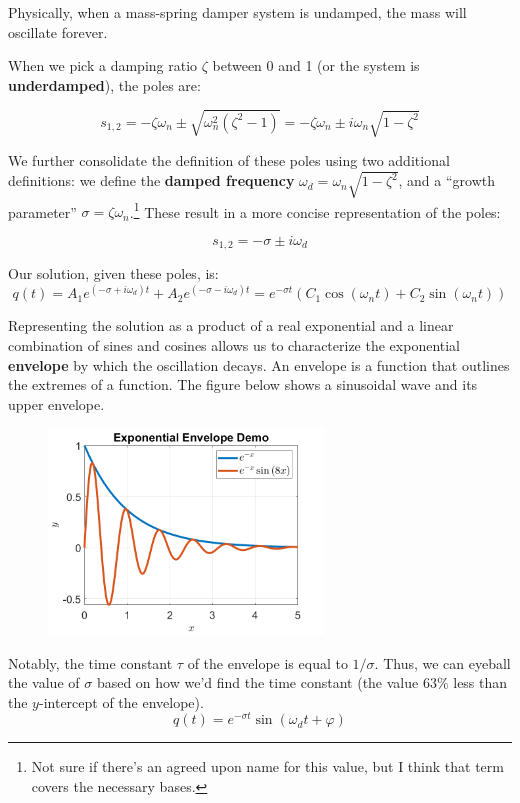 \documentclass[
  letterpaper,
  DIV=11,
  numbers=noendperiod]{scrreprt}
\begin{document}
Physically, when a mass-spring damper system is undamped, the mass will
oscillate forever.

When we pick a damping ratio \(\zeta\) between 0 and 1 (or the system is
\textbf{underdamped}), the poles are:

\[s_{1, 2} = -\zeta \omega_n \pm \sqrt{\omega_n^2 (\zeta^2 - 1)} = -\zeta \omega_n \pm i \omega_n \sqrt{1 - \zeta^2}\]

We further consolidate the definition of these poles using two
additional definitions: we define the \textbf{damped frequency}
\(\omega_d = \omega_n \sqrt{1-\zeta^2}\), and a ``growth parameter''
\(\sigma = \zeta \omega_n\).\footnote{Not sure if there's an agreed upon
  name for this value, but I think that term covers the necessary bases.}
These result in a more concise representation of the poles:

\[s_{1, 2}  = - \sigma \pm i \omega_d \]

Our solution, given these poles, is:
\[q(t) = A_1 e^{(-\sigma + i\omega_d) t} + A_2 e^{(-\sigma - i\omega_d) t} = e^{-\sigma t} (C_1 \cos(\omega_n t) + C_2 \sin(\omega_n t))\]

Representing the solution as a product of a real exponential and a
linear combination of sines and cosines allows us to characterize the
exponential \textbf{envelope} by which the oscillation decays. An
envelope is a function that outlines the extremes of a function. The
figure below shows a sinusoidal wave and its upper envelope.

\begin{figure}

{\centering \includegraphics[width=0.65\textwidth,height=\textheight]{figs/3_env.png}

}

\end{figure}

Notably, the time constant \(\tau\) of the envelope is equal to
\(1/\sigma\). Thus, we can eyeball the value of \(\sigma\) based on how
we'd find the time constant (the value \(63\%\) less than the
\(y\)-intercept of the envelope).
\[q(t) = e^{-\sigma t} \sin(\omega_d t + \varphi)\]
\end{document}
